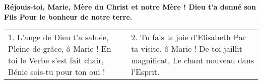 
\textbf{
Réjouis-toi, Marie,
Mère du Christ et notre Mère !
Dieu t’a donné son Fils
Pour le bonheur de notre terre.
}

\begin{tabular}{@{}p{} p{}@{}}
1.
L’ange de Dieu t’a saluée,\newline
Pleine de grâce, ô Marie !\newline
En toi le Verbe s’est fait chair,\newline
Bénie sois-tu pour ton oui !
&
2.
Tu fais la joie d’Elisabeth\newline
Par ta visite, ô Marie !\newline
De toi jaillit magnificat,\newline
Le chant nouveau dans l’Esprit.
\end{tabular}

